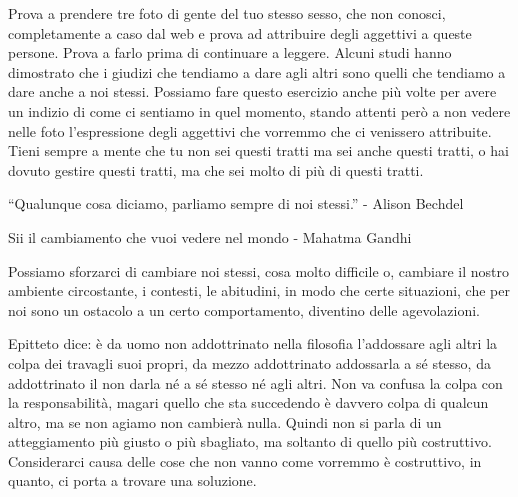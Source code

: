 \documentclass[12pt]{book} %
\begin{document}
Prova a prendere tre foto di gente del tuo stesso sesso, che non conosci, completamente a caso dal web e prova ad attribuire degli aggettivi a queste persone. 
Prova a farlo prima di continuare a leggere.
Alcuni studi hanno dimostrato che i giudizi che tendiamo a dare agli altri sono quelli che tendiamo a dare anche a noi stessi. Possiamo fare questo esercizio anche più volte per avere un indizio di come ci sentiamo in quel momento, stando attenti però a non vedere nelle foto l'espressione degli aggettivi che vorremmo che ci venissero attribuite. Tieni sempre a mente che tu non sei questi tratti ma sei anche questi tratti, o hai dovuto gestire questi tratti, ma che sei molto di più di questi tratti.

“Qualunque cosa diciamo, parliamo sempre di noi stessi.” - Alison Bechdel

Sii il cambiamento che vuoi vedere nel mondo - Mahatma Gandhi

Possiamo sforzarci di cambiare noi stessi, cosa molto difficile o, cambiare il nostro ambiente circostante, i contesti,
le abitudini, in modo che certe situazioni, che per noi sono un ostacolo a un certo comportamento, diventino delle agevolazioni.

Epitteto dice: è da uomo non addottrinato nella filosofia l'addossare agli altri la colpa dei
travagli suoi propri, da mezzo addottrinato addossarla a sé stesso, da addottrinato il non darla né a sé stesso né agli
altri. Non va confusa la colpa con la responsabilità, magari quello che sta succedendo è davvero colpa di qualcun altro, ma se non agiamo non
cambierà nulla. Quindi non si parla di un atteggiamento più giusto o più sbagliato, ma soltanto di quello più
costruttivo. Considerarci causa delle cose che non vanno come vorremmo è costruttivo, in quanto, ci porta a trovare una soluzione. 
\end{document}
